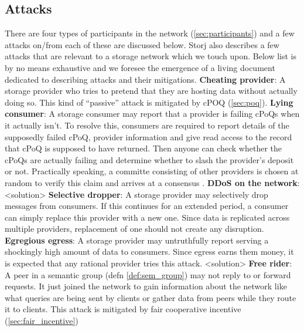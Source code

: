 \subsection{Attacks}
There are four types of participants in the network (\cref{sec:participants}) and a few attacks on/from each of these are discussed below. Storj \cite{Storj} also describes a few attacks that are relevant to a storage network which we touch upon. Below list is by no means exhaustive and we foresee the emergence of a living document dedicated to describing attacks and their mitigations.
\newline\newline
\textbf{Cheating provider}: A storage provider who tries to pretend that they are hosting data without actually doing so. This kind of ``passive'' attack is mitigated by cPOQ (\cref{sec:poq}).
\newline\newline
\textbf{Lying consumer}: A storage consumer may report that a provider is failing cPoQs when it actually isn't. To resolve this, consumers are required to report details of the supposedly failed cPoQ, provider information and give read access to the record that cPoQ is supposed to have returned. Then anyone can check whether the cPoQs are actually failing and determine whether to slash the provider's deposit or not. Practically speaking, a committe consisting of other providers is chosen at random to verify this claim and arrives at a consensus \cite{algorand}. 
\newline\newline
\textbf{DDoS on the network}: <solution>
\newline\newline
\textbf{Selective dropper}: A storage provider may selectively drop messages from consumers. If this continues for an extended period, a consumer can simply replace this provider with a new one. Since data is replicated across multiple providers, replacement of one should not create any disruption.
\newline\newline
\textbf{Egregious egress}: A storage provider may untruthfully report serving a shockingly high amount of data to consumers. Since egress earns them money, it is expected that any rational provider tries this attack. <solution>
\newline\newline
\textbf{Free rider}: A peer in a semantic group (defn \ref{def:sem_group}) may not reply to or forward requests. It just joined the network to gain information about the network like what queries are being sent by clients or gather data from peers while they route it to clients. This attack is mitigated by fair cooperative incentive (\cref{sec:fair_incentive})
